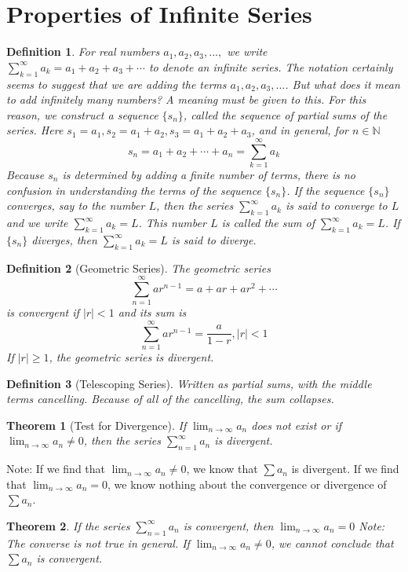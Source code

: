 \documentclass[10pt]{report}
\newtheorem{thm2}{Theorem}[section]
\newtheorem{def2}{Definition}[section]
\begin{document}
\section{Properties of Infinite Series}
\begin{def2}
For real numbers $a_1, a_2, a_3,...,$ we write $\sum_{k=1}^\infty a_k = a_1 + a_2 + a_3 + \cdots$ to denote an infinite series. The notation certainly seems to suggest that we are adding the terms $a_1, a_2, a_3,...$. But what does it mean to add infinitely many numbers? A meaning must be given to this. For this reason, we construct a sequence $\{s_n\}$, called the sequence of partial sums of the series. Here $s_1=a_1, s_2 = a_1+a_2,s_3 = a_1 + a_2 + a_3$, and in general, for $n\in \mathbb{N}$
$$s_n = a_1 + a_2 + \cdots + a_n = \sum_{k=1}^\infty a_k$$
Because $s_n$ is determined by adding a finite number of terms, there is no confusion in understanding the terms of the sequence $\{s_n\}$. If the sequence $\{s_n\}$ converges, say to the number $L$, then the series $\sum_{k=1}^\infty a_k$ is said to converge to $L$ and we write $\sum_{k=1}^\infty a_k = L$. This number $L$ is called the sum of $\sum_{k=1}^\infty a_k = L$. If $\{s_n\}$ diverges, then $\sum_{k=1}^\infty a_k = L$ is said to diverge.
\end{def2}
\begin{def2}[Geometric Series]
The geometric series
$$\sum_{n=1}^\infty ar^{n-1} = a + ar + ar^2 + \cdots$$
is convergent if $|r|<1$ and its sum is
$$\sum_{n=1}^\infty ar^{n-1} = \frac{a}{1-r}, |r|<1$$
If $|r|\geq 1$, the geometric series is divergent.
\end{def2}
\begin{def2}[Telescoping Series]
Written as partial sums, with the middle terms cancelling. Because of all of the cancelling, the sum collapses.
\end{def2}
\begin{thm2}[Test for Divergence]
 If $\lim_{n\to \infty}a_n$ does not exist or if $\lim_{n\to \infty}a_n \neq 0$, then the series $\sum_{n=1}^\infty a_n$ is divergent. 
\end{thm2}
Note: If we find that $\lim_{n\to \infty} a_n \neq 0$, we know that $\sum a_n$ is divergent. If we find that $\lim_{n\to \infty} a_n = 0$, we know nothing about the convergence or divergence of $\sum a_n$.
\begin{thm2}
If the series $\sum_{n=1}^\infty a_n$ is convergent, then $\lim_{n\to \infty} a_n =0$
Note: The converse is not true in general. If $\lim_{n\to \infty} a_n \neq 0$, we cannot conclude that $\sum a_n$ is convergent.
\end{thm2}
\end{document}
